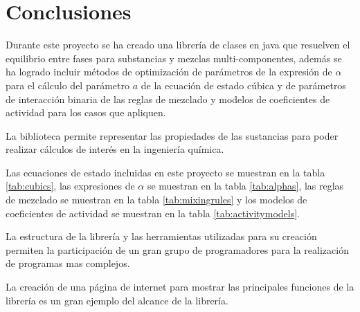 \chapter{Conclusiones}\label{chap:conclusions}

	Durante este proyecto se ha creado una librería de clases en java que resuelven el equilibrio entre fases para substancias y mezclas multi-componentes, además se ha logrado incluir métodos de optimización de parámetros de la expresión de $\alpha$ para el cálculo del parámetro $a$ de la ecuación de estado cúbica y de parámetros de interacción binaria de las reglas de mezclado y modelos de coeficientes de actividad para los casos que apliquen.

	La biblioteca permite representar las propiedades de las sustancias para poder realizar cálculos de interés en la ingeniería química.

	Las ecuaciones de estado incluidas en este proyecto se muestran en la tabla \ref{tab:cubics}, las expresiones de $\alpha$ se muestran en la tabla \ref{tab:alphas}, las reglas de mezclado se muestran en la tabla \ref{tab:mixingrules} y los modelos de coeficientes de actividad se muestran en la tabla \ref{tab:activitymodels}.

	La estructura de la librería y las herramientas utilizadas para su creación permiten la participación de un gran grupo de programadores para la realización de programas mas complejos.

	La creación de una página de internet para mostrar las principales funciones de la librería es un gran ejemplo del alcance de la librería.

